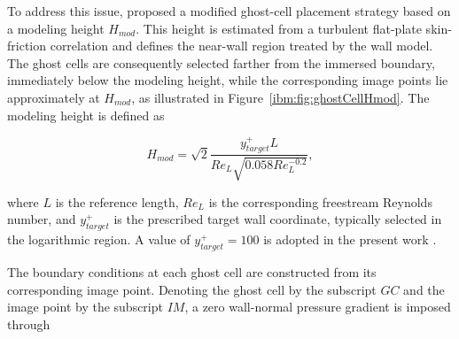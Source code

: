 




To address this issue, \cite{CONSTANT2021110240} proposed a modified ghost-cell placement strategy based on a modeling height $H_{mod}$. This height is estimated from a turbulent flat-plate skin-friction correlation and defines the near-wall region treated by the wall model. The ghost cells are consequently selected farther from the immersed boundary, immediately below the modeling height, while the corresponding image points lie approximately at $H_{mod}$, as illustrated in Figure~\ref{ibm:fig:ghostCellHmod}. The modeling height is defined as

\begin{equation}
    H_{mod} = \sqrt{2}\frac{y_{target}^+L}{Re_L\sqrt{0.058Re_L^{-0.2}}},
    \label{ibm:eq:hmod}
\end{equation}

where $L$ is the reference length, $Re_L$ is the corresponding freestream Reynolds number, and $y_{target}^+$ is the prescribed target wall coordinate, typically selected in the logarithmic region. A value of $y_{target}^+=100$ is adopted in the present work \cite{CONSTANT2021110240}.

The boundary conditions at each ghost cell are constructed from its corresponding image point. Denoting the ghost cell by the subscript $GC$ and the image point by the subscript $IM$, a zero wall-normal pressure gradient is imposed through

